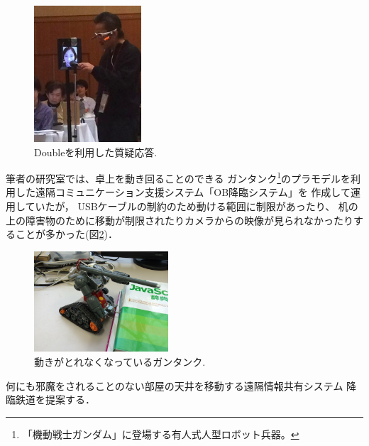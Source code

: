 \documentclass[submit,techreq]{ipsj}
\begin{document}
\begin{figure}[t]
\centerline{\includegraphics[width=40mm]{figures/b74f4564d4b38d12e48fcf80fef96def.png}}
\caption{Doubleを利用した質疑応答.}
\label{double}
\end{figure}

筆者の研究室では、卓上を動き回ることのできる
ガンタンク\footnote{
  「機動戦士ガンダム」に登場する有人式人型ロボット兵器。
}のプラモデルを利用した遠隔コミュニケーション支援システム「OB降臨システム」を
作成して運用していたが\cite{Hirota:Korin}，
USBケーブルの制約のため動ける範囲に制限があったり、
机の上の障害物のために移動が制限されたりカメラからの映像が見られなかったりすることが多かった(図\ref{guntank})．

\begin{figure}[H]
\centerline{\includegraphics[width=50mm]{figures/1e8781bb2a5b28c8e06906d226c7505a.png}}
\caption{動きがとれなくなっているガンタンク.}
\label{guntank}
\end{figure}



何にも邪魔をされることのない部屋の天井を移動する遠隔情報共有システム
降臨鉄道を提案する．


% 
% 
% 
\end{document}
